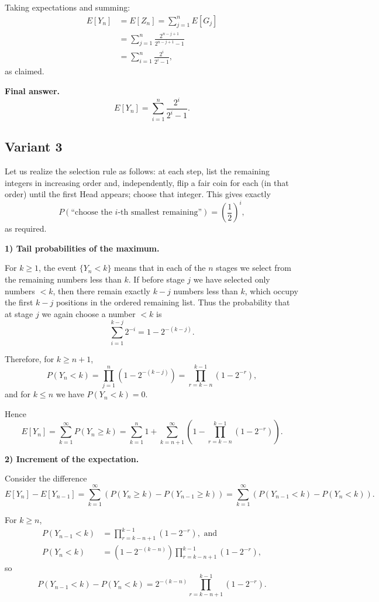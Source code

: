 \documentclass[12pt,a4paper]{article}
\theoremstyle{definition}
\begin{document}
    Taking expectations and summing:
    \begin{align}
        E[Y_n] &= E[Z_n] = \sum_{j=1}^{n} E[G_j]\\
        &= \sum_{j=1}^{n} \frac{2^{n-j+1}}{2^{n-j+1} - 1}\\
        &= \sum_{i=1}^{n} \frac{2^i}{2^i - 1},
    \end{align}
    as claimed.

    \textbf{Final answer.}
    $$E[Y_n] = \sum_{i=1}^{n} \frac{2^i}{2^i - 1}.$$
    \subsection{Variant 3}
    Let us realize the selection rule as follows: at each step, list the remaining integers in increasing order and, independently, flip a fair coin for each (in that order) until the first Head appears; choose that integer. This gives exactly
    \[P(\text{``choose the $i$-th smallest remaining''}) = \left(\frac{1}{2}\right)^i,\]
    as required.

    \textbf{1) Tail probabilities of the maximum.}

    For $k \geq 1$, the event $\{Y_n < k\}$ means that in each of the $n$ stages we select from the remaining numbers less than $k$. If before stage $j$ we have selected only numbers $< k$, then there remain exactly $k-j$ numbers less than $k$, which occupy the first $k-j$ positions in the ordered remaining list. Thus the probability that at stage $j$ we again choose a number $< k$ is
    \[\sum_{i=1}^{k-j} 2^{-i} = 1 - 2^{-(k-j)}.\]

    Therefore, for $k \geq n+1$,
    \[P(Y_n < k) = \prod_{j=1}^{n} (1 - 2^{-(k-j)}) = \prod_{r=k-n}^{k-1} (1 - 2^{-r}),\]
    and for $k \leq n$ we have $P(Y_n < k) = 0$.

    Hence
    \[E[Y_n] = \sum_{k=1}^{\infty} P(Y_n \geq k) = \sum_{k=1}^{n} 1 + \sum_{k=n+1}^{\infty} \left(1 - \prod_{r=k-n}^{k-1} (1 - 2^{-r})\right).\]

    \textbf{2) Increment of the expectation.}

    Consider the difference
    \[E[Y_n] - E[Y_{n-1}] = \sum_{k=1}^{\infty} (P(Y_n \geq k) - P(Y_{n-1} \geq k)) = \sum_{k=1}^{\infty} (P(Y_{n-1} < k) - P(Y_n < k)).\]

    For $k \geq n$,
    \begin{align}
        P(Y_{n-1} < k) &= \prod_{r=k-n+1}^{k-1} (1 - 2^{-r}), \text{ and}\\
        P(Y_n < k) &= (1 - 2^{-(k-n)}) \prod_{r=k-n+1}^{k-1} (1 - 2^{-r}),
    \end{align}
    so
    \[P(Y_{n-1} < k) - P(Y_n < k) = 2^{-(k-n)} \prod_{r=k-n+1}^{k-1} (1 - 2^{-r}).\]
\end{document}
